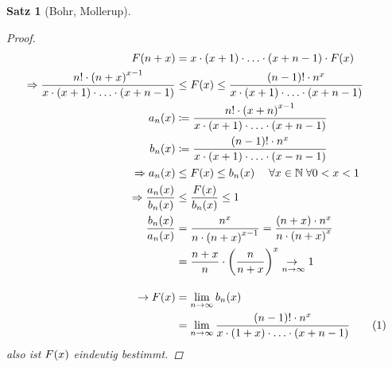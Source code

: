 \documentclass[11pt, twoside, a4paper]{article}
\theoremstyle{plain}
\newtheorem{satz}[blockelement]{Satz}
\numberwithin{equation}{subsection}
\newcommand{\numberthis}[0]{\addtocounter{equation}{1}\tag{\theequation}}
\newcommand{\pair}[1]{\left(#1\right)}
\newcommand{\of}[1]{\mathopen{}\mathclose{}\bgroup\left(#1\aftergroup\egroup\right)}
\newcommand{\impl}[0]{\Rightarrow{}}
\newcommand{\fromto}{\rightarrow{}}
\newcommand{\ntoinf}[0]{n\fromto\infty}
\newcommand{\fa}{\;\forall}
\newcommand{\N}{\mathbb{N}}
\begin{document}
\begin{satz}[Bohr, Mollerup]
\begin{proof}
\begin{align*}
                F\of{n+x} &= x\cdot\pair{x+1}\cdot\ldots\cdot \pair{x+n-1}\cdot F\of{x}\\
                \impl \frac{n!\cdot\pair{n+x}^{x-1}}{x\cdot \pair{x+1}\cdot\ldots\cdot\pair{x+n-1}} &\leq F\of{x} \leq \frac{\pair{n-1}!\cdot n^x}{x\cdot\pair{x+1}\cdot\ldots\cdot \pair{x+n-1}}\\
                a_n\of{x} &\coloneqq \frac{n!\cdot\pair{x+n}^{x-1}}{x\cdot \pair{x+1}\cdot\ldots\cdot\pair{x+n-1}}\\
                b_n\of{x} &\coloneqq \frac{\pair{n-1}!\cdot n^x}{x\cdot\pair{x+1}\cdot\ldots\cdot \pair{x-n-1}}\\
                \impl a_n\of{x} &\leq F\of{x} \leq b_n\of{x}\quad\fa x\in\N\fa 0 < x < 1\\
                \impl \frac{a_n\of{x}}{b_n\of{x}} &\leq \frac{F\of{x}}{b_n\of{x}} \leq 1\\
                \frac{b_n\of{x}}{a_n\of{x}} &= \frac{n^x}{n\cdot\pair{n+x}^{x-1}} = \frac{\pair{n+x}\cdot n^x}{n\cdot\pair{n+x}^x}\\
                &= \frac{n+x}{n}\cdot\pair{\frac{n}{n+x}}^x\underset{\ntoinf}{\fromto}  1\\[10pt]
                \fromto F\of{x} &= \lim_{\ntoinf} b_n\of{x}\\
                &= \lim_{\ntoinf} \frac{\pair{n-1}! \cdot n^x}{x\cdot\pair{1+x}\cdot \ldots\cdot \pair{x+n-1}}\numberthis\label{eq:gamma-alt}
            \end{align*}
            also ist $F\of{x}$ eindeutig bestimmt.
        \end{proof}
    \end{satz}
\end{document}
